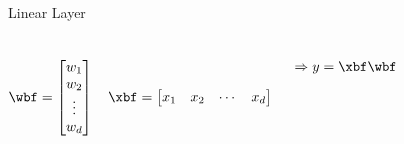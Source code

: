 \documentclass[aspectratio=169,xcolor=dvipsnames,svgnames,x11names,fleqn]{beamer}
\begin{document}
\begin{frame}{Linear Layer}
\begin{columns}
\begin{align*}
\wbf = \begin{bmatrix}
w_1 \\ w_2 \\ \vdots \\ w_d
\end{bmatrix} \quad \xbf = \begin{bmatrix}
x_1 & x_2 & \cdots & x_d
\end{bmatrix} 
\end{align*}

\pause 

\begin{align*}
\Rightarrow y = \xbf \wbf
\end{align*}
\end{columns}



\end{frame}
\end{document}
